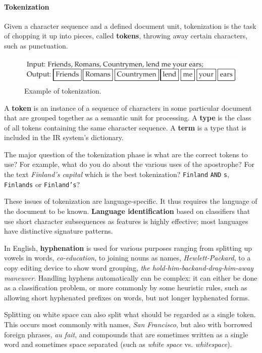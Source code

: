 \documentclass[letterpaper,11pt]{article}
\newcommand{\code}[1]{\texttt{#1}}
\begin{document}
\paragraph{Tokenization}
Given a character sequence and a defined document unit, tokenization is the task of chopping it up into pieces, called \textbf{tokens}, throwing away certain characters, such as punctuation.
\begin{figure}[H]
    \centering
    \includegraphics[scale=0.8]{sect2/figure2_1.png}
    \caption{Example of tokenization.}
\end{figure}
A \textbf{token} is an instance of a sequence of characters in some particular document that are grouped together as a semantic unit for processing. A \textbf{type} is the class of all tokens containing the same character sequence. A \textbf{term} is a type that is included in the IR system’s dictionary.

The major question of the tokenization phase is what are the correct tokens to use? For example, what do you do about the various uses of the apostrophe? For the text \textit{Finland's capital} which is the best tokenization? \code{Finland} \code{AND} \code{s}, \code{Finlands} or \code{Finland's}? 

These issues of tokenization are language-specific. It thus requires the language of the document to be known. \textbf{Language identification} based on classifiers that use short character subsequences as features is highly effective; most languages have distinctive signature patterns.

In English, \textbf{hyphenation} is used for various purposes ranging from splitting up vowels in words, \textit{co-education}, to joining nouns as names, \textit{Hewlett-Packard}, to a copy editing device to show word grouping, \textit{the hold-him-backand-drag-him-away maneuver}. Handling hyphens automatically can be complex: it can either be done as a classification problem, or more commonly by some heuristic rules, such as allowing short hyphenated prefixes on words, but not longer hyphenated forms. 

Splitting on white space can also split what should be regarded as a single token. This occurs most commonly with names, \textit{San Francisco}, but also with borrowed foreign phrases, \textit{au fait}, and compounds that are sometimes written as a single word and sometimes space separated (such as \textit{white space} vs. \textit{whitespace}).
\end{document}

